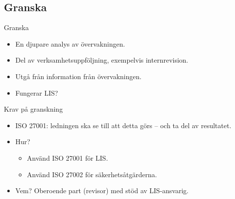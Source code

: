 \documentclass{beamer}
\begin{document}
\subsection{Granska}
\begin{frame}{Granska}
  \begin{itemize}
    \item En djupare analys av övervakningen.
    \item Del av verksamhetsuppföljning, exempelvis internrevision.
    \item Utgå från information från övervakningen.
    \item Fungerar LIS\@?
  \end{itemize}
\end{frame}
\begin{frame}{Krav på granskning}
  \begin{itemize}
    \item ISO 27001: ledningen ska se till att detta görs -- och ta del av 
      resultatet.
    \item Hur?
      \begin{itemize}
        \item Använd ISO 27001 för LIS\@.
        \item Använd ISO 27002 för säkerhetsåtgärderna.
      \end{itemize}
    \item Vem?
      Oberoende part (revisor) med stöd av LIS-ansvarig.
  \end{itemize}
\end{frame}
\end{document}
